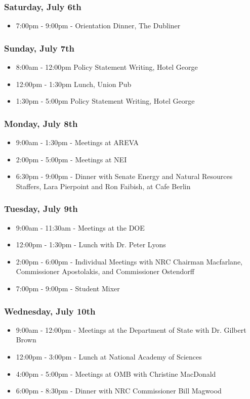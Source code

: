 \subsubsection*{Saturday, July 6th}
\begin{itemize}
  \item 7:00pm - 9:00pm - Orientation Dinner, The Dubliner
\end{itemize}

\subsubsection*{Sunday, July 7th}
\begin{itemize}
  \item 8:00am - 12:00pm Policy Statement Writing, Hotel George
  \item 12:00pm - 1:30pm Lunch, Union Pub
  \item 1:30pm - 5:00pm Policy Statement Writing, Hotel George
\end{itemize}

\subsubsection*{Monday, July 8th}
\begin{itemize}
  \item 9:00am - 1:30pm - Meetings at AREVA
  \item 2:00pm - 5:00pm - Meetings at NEI
  \item 6:30pm - 9:00pm - Dinner with Senate Energy and Natural Resources
    Staffers, Lara Pierpoint and Ron Faibish, at Cafe Berlin
\end{itemize}

\subsubsection*{Tuesday, July 9th}
\begin{itemize}
  \item 9:00am - 11:30am - Meetings at the DOE
  \item 12:00pm - 1:30pm - Lunch with Dr. Peter Lyons
  \item 2:00pm - 6:00pm - Individual Meetings with NRC Chairman Macfarlane,
    Commissioner Apostolakis, and Commissioner Ostendorff
  \item 7:00pm - 9:00pm - Student Mixer
\end{itemize}

\subsubsection*{Wednesday, July 10th}
\begin{itemize}
  \item 9:00am - 12:00pm - Meetings at the Department of State with Dr. Gilbert
    Brown
  \item 12:00pm - 3:00pm - Lunch at National Academy of Sciences
  \item 4:00pm - 5:00pm - Meetings at OMB with Christine MacDonald
  \item 6:00pm - 8:30pm - Dinner with NRC Commissioner Bill Magwood
\end{itemize}

